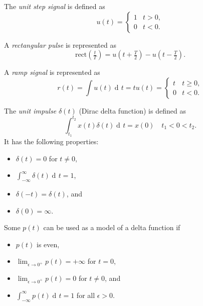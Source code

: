 \documentclass[10pt,letterpaper]{article}
\DeclareMathOperator{\di}{d\!} %
\newcommand{\bracks}[1]{ \left( #1 \right) } %
\newcommand{\tpfrac}[2]{\left(\tfrac{#1}{#2}\right)} %
\newcommand{\rect}{ \text{rect} }
\newcommand{\impulse}{ \delta(t) }
\newcommand{\Iint}{ \int_{-\infty}^{\infty} }
\newcommand{\tint}{ \int_{t_1}^{t_2} }
\begin{document}
\begin{multicols*}{3}
%



The \textit{unit step signal} is defined as
\[ u(t) = \begin{cases} 
      		1 & t > 0, \\
      		0 & t < 0. 
   		\end{cases}
\]

A \textit{rectangular pulse} is represented as
\[ \rect\tpfrac{t}{T} = u\bracks{t + \tfrac{T}{2}} - u\bracks{t - \tfrac{T}{2}}. \]

A \textit{ramp signal} is represented as
\[ r(t) = \int u(t) \di t = tu(t) = \begin{cases} 
		      		t & t \geq 0, \\
		      		0 & t < 0. 
		   		\end{cases}
\]

The \textit{unit impulse} $\impulse$ (Dirac delta function) is defined as
\[ \tint x(t) \impulse \di t = x(0) \quad t_1 < 0 < t_2. \]
It has the following properties:
\begin{itemize}[leftmargin=0.5cm]
\item $\impulse = 0$ for $t \neq 0$,
\item $\displaystyle \Iint \impulse \di t = 1$,
\item $\delta(-t) = \impulse$, and
\item $\delta(0) = \infty$.
\end{itemize}

Some $p(t)$ can be used as a model of a delta function if
\begin{itemize}[leftmargin=0.5cm]
\item $p(t)$ is even,
\item $\displaystyle \lim_{\epsilon \rightarrow 0^+} p(t) = +\infty$ for $t = 0$,
\item $\displaystyle \lim_{\epsilon \rightarrow 0^+} p(t) = 0$ for $t \neq 0$, and
\item $\displaystyle \Iint p(t) \di t = 1$ for all $\epsilon > 0$.
\end{itemize}


\end{multicols*}
\end{document}
